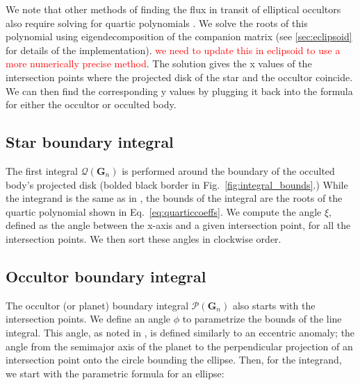 \documentclass[twocolumn]{aastex631}
\begin{document}
\twocolumngrid
We note that other methods of finding the flux in transit of elliptical occultors also require solving for quartic polynomials \citep{rein2023}. We solve the roots of this polynomial using eigendecomposition of the companion matrix (see \ref{sec:eclipsoid} for details of the implementation). \textcolor{red}{we need to update this in eclipsoid to use a more numerically precise method}. The solution gives the x values of the intersection points where the projected disk of the star and the occultor coincide. We can then find the corresponding y values by plugging it back into the formula for either the occultor or occulted body. 

\subsection{Star boundary integral}
The first integral $\mathcal{Q}(\mathbf{G}_n)$ is performed around the boundary of the occulted body's projected disk (bolded black border in Fig.~\ref{fig:integral_bounds}.) While the integrand is the same as in \citet{starry2019}, the bounds of the integral are the roots of the quartic polynomial shown in Eq.~\ref{eq:quarticcoeffs}. We compute the angle $\xi$, defined as the angle between the x-axis and a given intersection point, for all the intersection points. We then sort these angles in clockwise order. 

\subsection{Occultor boundary integral}
The occultor (or planet) boundary integral $\mathcal{P}(\mathbf{G}_n)$ also starts with the intersection points. We define an angle $\phi$ to parametrize the bounds of the line integral. This angle, as noted in \citet{dholakia2022}, is defined similarly to an eccentric anomaly; the angle from the semimajor axis of the planet to the perpendicular projection of an intersection point onto the circle bounding the ellipse. Then, for the integrand, we start with the parametric formula for an ellipse:
\end{document}

